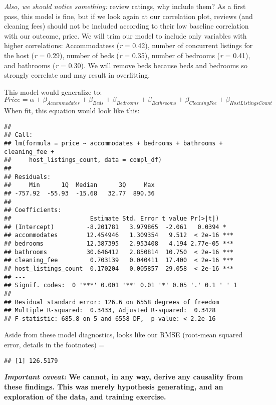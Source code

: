 \documentclass[]{article}
\begin{document}
\emph{Also, we should notice something:} review ratings, why include
them? As a first pass, this model is fine, but if we look again at our
correlation plot, reviews (and cleaning fees) should not be included
according to their low baseline correlation with our outcome, price. We
will trim our model to include only variables with higher correlations:
Accommodatess (\emph{r} = 0.42), number of concurrent listings for the
host (\emph{r} = 0.29), number of beds (\emph{r} = 0.35), number of
bedrooms (\emph{r} = 0.41), and bathrooms (\emph{r} = 0.30). We will
remove beds because beds and bedrooms so strongly correlate and may
result in overfitting.

This model would generalize to:
\[Price = \alpha + \beta_{Accommodates} + \beta_{Beds} + \beta_{Bedrooms} + \beta_{Bathrooms} + \beta_{Cleaning Fee} + \beta_{Host Listings Count} \]
When fit, this equation would look like this:

\begin{verbatim}
## 
## Call:
## lm(formula = price ~ accommodates + bedrooms + bathrooms + cleaning_fee + 
##     host_listings_count, data = compl_df)
## 
## Residuals:
##     Min      1Q  Median      3Q     Max 
## -757.92  -55.93  -15.68   32.77  890.36 
## 
## Coefficients:
##                      Estimate Std. Error t value Pr(>|t|)    
## (Intercept)         -8.201781   3.979865  -2.061   0.0394 *  
## accommodates        12.454946   1.309354   9.512  < 2e-16 ***
## bedrooms            12.387395   2.953408   4.194 2.77e-05 ***
## bathrooms           30.646412   2.850814  10.750  < 2e-16 ***
## cleaning_fee         0.703139   0.040411  17.400  < 2e-16 ***
## host_listings_count  0.170204   0.005857  29.058  < 2e-16 ***
## ---
## Signif. codes:  0 '***' 0.001 '**' 0.01 '*' 0.05 '.' 0.1 ' ' 1
## 
## Residual standard error: 126.6 on 6558 degrees of freedom
## Multiple R-squared:  0.3433, Adjusted R-squared:  0.3428 
## F-statistic: 685.8 on 5 and 6558 DF,  p-value: < 2.2e-16
\end{verbatim}

Aside from these model diagnostics, looks like our RMSE (root-mean
squared error, details in the footnotes) =

\begin{verbatim}
## [1] 126.5179
\end{verbatim}

\textbf{\emph{Important caveat:} We cannot, in any way, derive any
causality from these findings. This was merely hypothesis generating,
and an exploration of the data, and training exercise.}
\end{document}
